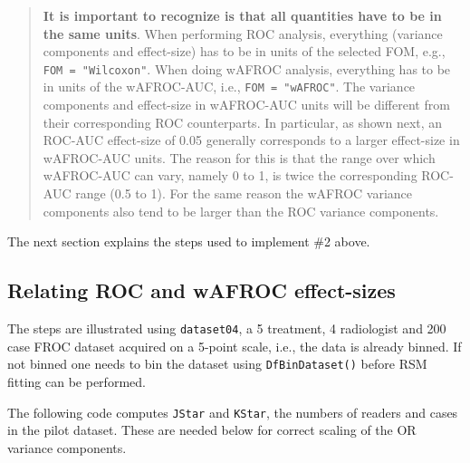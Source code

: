\documentclass[
]{book}
\newenvironment{Shaded}{\begin{snugshade}}{\end{snugshade}}
\newcommand{\DecValTok}[1]{\textcolor[rgb]{0.00,0.00,0.81}{#1}}
\newcommand{\FunctionTok}[1]{\textcolor[rgb]{0.00,0.00,0.00}{#1}}
\newcommand{\NormalTok}[1]{#1}
\newcommand{\OtherTok}[1]{\textcolor[rgb]{0.56,0.35,0.01}{#1}}
\newcommand{\SpecialCharTok}[1]{\textcolor[rgb]{0.00,0.00,0.00}{#1}}
\begin{document}
\begin{quote}
\textbf{It is important to recognize is that all quantities have to be in the same units}. When performing ROC analysis, everything (variance components and effect-size) has to be in units of the selected FOM, e.g., \texttt{FOM\ =\ "Wilcoxon"}. When doing wAFROC analysis, everything has to be in units of the wAFROC-AUC, i.e., \texttt{FOM\ =\ "wAFROC"}. The variance components and effect-size in wAFROC-AUC units will be different from their corresponding ROC counterparts. In particular, as shown next, an ROC-AUC effect-size of 0.05 generally corresponds to a larger effect-size in wAFROC-AUC units. The reason for this is that the range over which wAFROC-AUC can vary, namely 0 to 1, is twice the corresponding ROC-AUC range (0.5 to 1). For the same reason the wAFROC variance components also tend to be larger than the ROC variance components.
\end{quote}

The next section explains the steps used to implement \#2 above.

\hypertarget{relating-roc-and-wafroc-effect-sizes}{%
\subsection{Relating ROC and wAFROC effect-sizes}\label{relating-roc-and-wafroc-effect-sizes}}

The steps are illustrated using \texttt{dataset04}, a 5 treatment, 4 radiologist and 200 case FROC dataset \citep{zanca2009evaluation} acquired on a 5-point scale, i.e., the data is already binned. If not binned one needs to bin the dataset using \texttt{DfBinDataset()} before RSM fitting can be performed.

The following code computes \texttt{JStar} and \texttt{KStar}, the numbers of readers and cases in the pilot dataset. These are needed below for correct scaling of the OR variance components.

\begin{Shaded}
\end{Shaded}
\end{document}
